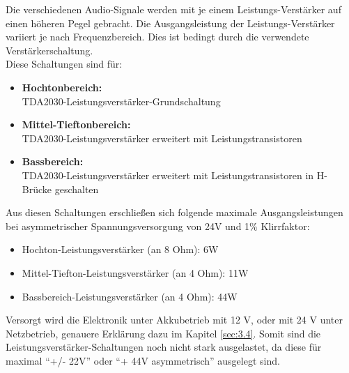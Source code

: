 Die verschiedenen Audio-Signale werden mit je einem Leistungs-Verstärker auf einen höheren Pegel gebracht.
Die Ausgangsleistung der Leistungs-Verstärker variiert je nach Frequenzbereich.
Dies ist bedingt durch die verwendete Verstärkerschaltung.\\
Diese Schaltungen sind für:
\begin{itemize}
	\item \textbf{Hochtonbereich:}\\ TDA2030-Leistungsverstärker-Grundschaltung
	\item \textbf{Mittel-Tieftonbereich:}\\ TDA2030-Leistungsverstärker erweitert mit Leistungstransistoren
	\item \textbf{Bassbereich:}\\ TDA2030-Leistungsverstärker erweitert mit Leistungstransistoren in H-Brücke geschalten
\end{itemize}
Aus diesen Schaltungen erschließen sich folgende maximale Ausgangsleistungen bei asymmetrischer Spannungsversorgung von 24V und 1\% Klirrfaktor:\\
\begin{itemize}
	\item Hochton-Leistungsverstärker (an 8 Ohm): 6W
	\item Mittel-Tiefton-Leistungsverstärker (an 4 Ohm): 11W
	\item Bassbereich-Leistungsverstärker (an 4 Ohm): 44W
\end{itemize}

Versorgt wird die Elektronik unter Akkubetrieb mit 12 V, oder mit 24 V unter Netzbetrieb, genauere Erklärung dazu im Kapitel \ref{sec:3.4}.
Somit sind die Leistungsverstärker-Schaltungen noch nicht stark ausgelastet, da diese für maximal \enquote{+/- 22V} oder \enquote{+ 44V asymmetrisch} ausgelegt sind.


\newpage
